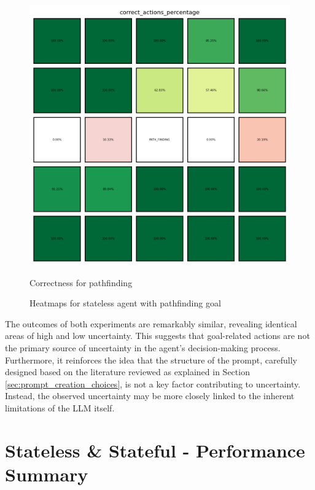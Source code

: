\begin{figure}[!ht]
\begin{minipage}[b]{0.45\textwidth}
    \includegraphics[width=\textwidth]{
      images/results_discussion/path_finding/correct_actions_percentage_PERC.png
    }
    \caption{Correctness for pathfinding}
    \label{fig:path_finding_corr}
  \end{minipage}
  \caption{Heatmaps for stateless agent with pathfinding goal}
  \label{fig:path_finding}
\end{figure}

The outcomes of both experiments are remarkably similar, revealing identical
areas of high and low uncertainty. This suggests that goal-related actions are not
the primary source of uncertainty in the agent's decision-making process.
Furthermore, it reinforces the idea that the structure of the prompt, carefully
designed based on the literature reviewed as explained in Section
\ref{sec:prompt_creation_choices}, is not a key factor contributing to uncertainty.
Instead, the observed uncertainty may be more closely linked to the inherent limitations
of the LLM itself.

\section{Stateless \& Stateful - Performance Summary}
\label{sec:stateless_and_stateful_combined_results}

